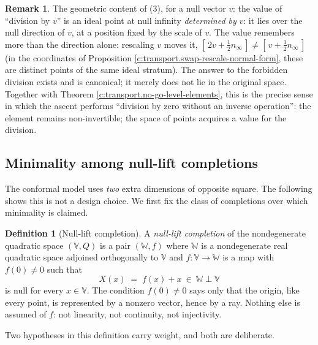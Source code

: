 \documentclass[11pt]{article}
\theoremstyle{definition}
\newtheorem{definition}[theorem]{Definition}
\newtheorem{remark}[theorem]{Remark}
\theoremstyle{plain}
\providecommand{\nInf}{}\renewcommand{\nInf}{n_\infty}
\begin{document}
\begin{remark}\label{c:note.transport.destination}
The geometric content of (3), for a null vector $v$: the value of ``division by $v$'' is an ideal point at null infinity \emph{determined by} $v$: it lies over the null direction of $v$, at a position fixed by the scale of $v$. The value remembers more than the direction alone: rescaling $v$ moves it, $[\,2v + \tfrac12\nInf\,] \neq [\,v + \tfrac12\nInf\,]$ (in the coordinates of Proposition \ref{c:transport.swap-rescale-normal-form}, these are distinct points of the same ideal stratum). The answer to the forbidden division exists and is canonical; it merely does not lie in the original space. Together with Theorem \ref{c:transport.no-go-level-elements}, this is the precise sense in which the ascent performs ``division by zero without an inverse operation'': the element remains non-invertible; the space of points acquires a value for the division.
\end{remark}

\subsection*{Minimality among null-lift completions}
\label{c:note.transport.setting-minimality-among-null-lift-completions}
The conformal model uses \emph{two} extra dimensions of opposite square. The following shows this is not a design choice. We first fix the class of completions over which minimality is claimed.

\begin{definition}[Null-lift completion]\label{c:obj.transport.null-lift-completion}
A \emph{null-lift completion} of the nondegenerate quadratic space $(\mathbb{V}, Q)$ is a pair $(\mathbb{W}, f)$ where $\mathbb{W}$ is a nondegenerate real quadratic space adjoined orthogonally to $\mathbb{V}$ and $f : \mathbb{V} \to \mathbb{W}$ is a map with $f(0) \neq 0$ such that
\[
X(x) \;=\; f(x) + x \ \in\ \mathbb{W} \perp \mathbb{V}
\]
is null for every $x \in \mathbb{V}$. The condition $f(0) \neq 0$ says only that the origin, like every point, is represented by a nonzero vector, hence by a ray. Nothing else is assumed of $f$: not linearity, not continuity, not injectivity.
\end{definition}

\label{c:note.transport.setting-minimality-among-null-lift-completions-2}
Two hypotheses in this definition carry weight, and both are deliberate.
\end{document}
